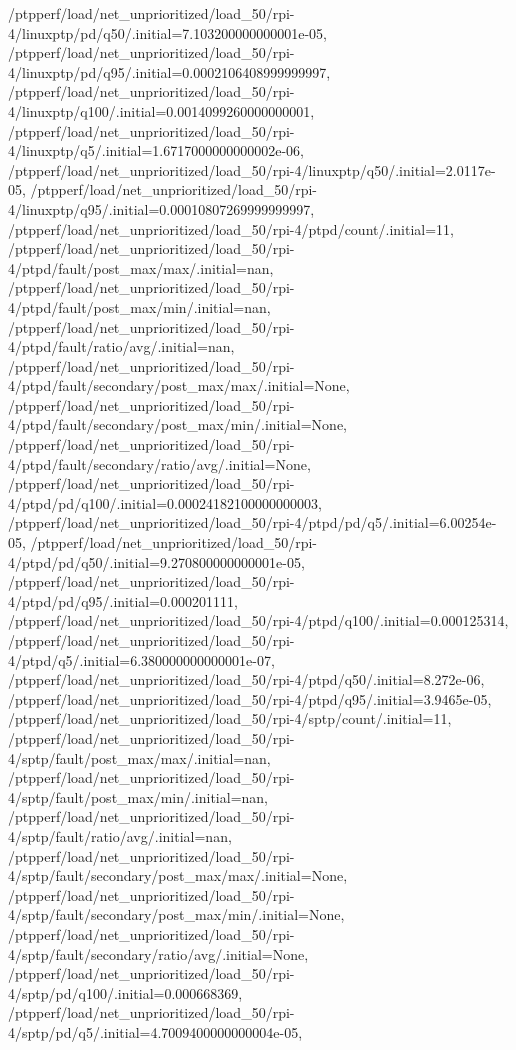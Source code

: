 {    /ptpperf/load/net_unprioritized/load_50/rpi-4/linuxptp/pd/q50/.initial=7.103200000000001e-05,
    /ptpperf/load/net_unprioritized/load_50/rpi-4/linuxptp/pd/q95/.initial=0.0002106408999999997,
    /ptpperf/load/net_unprioritized/load_50/rpi-4/linuxptp/q100/.initial=0.0014099260000000001,
    /ptpperf/load/net_unprioritized/load_50/rpi-4/linuxptp/q5/.initial=1.6717000000000002e-06,
    /ptpperf/load/net_unprioritized/load_50/rpi-4/linuxptp/q50/.initial=2.0117e-05,
    /ptpperf/load/net_unprioritized/load_50/rpi-4/linuxptp/q95/.initial=0.00010807269999999997,
    /ptpperf/load/net_unprioritized/load_50/rpi-4/ptpd/count/.initial=11,
    /ptpperf/load/net_unprioritized/load_50/rpi-4/ptpd/fault/post_max/max/.initial=nan,
    /ptpperf/load/net_unprioritized/load_50/rpi-4/ptpd/fault/post_max/min/.initial=nan,
    /ptpperf/load/net_unprioritized/load_50/rpi-4/ptpd/fault/ratio/avg/.initial=nan,
    /ptpperf/load/net_unprioritized/load_50/rpi-4/ptpd/fault/secondary/post_max/max/.initial=None,
    /ptpperf/load/net_unprioritized/load_50/rpi-4/ptpd/fault/secondary/post_max/min/.initial=None,
    /ptpperf/load/net_unprioritized/load_50/rpi-4/ptpd/fault/secondary/ratio/avg/.initial=None,
    /ptpperf/load/net_unprioritized/load_50/rpi-4/ptpd/pd/q100/.initial=0.00024182100000000003,
    /ptpperf/load/net_unprioritized/load_50/rpi-4/ptpd/pd/q5/.initial=6.00254e-05,
    /ptpperf/load/net_unprioritized/load_50/rpi-4/ptpd/pd/q50/.initial=9.270800000000001e-05,
    /ptpperf/load/net_unprioritized/load_50/rpi-4/ptpd/pd/q95/.initial=0.000201111,
    /ptpperf/load/net_unprioritized/load_50/rpi-4/ptpd/q100/.initial=0.000125314,
    /ptpperf/load/net_unprioritized/load_50/rpi-4/ptpd/q5/.initial=6.380000000000001e-07,
    /ptpperf/load/net_unprioritized/load_50/rpi-4/ptpd/q50/.initial=8.272e-06,
    /ptpperf/load/net_unprioritized/load_50/rpi-4/ptpd/q95/.initial=3.9465e-05,
    /ptpperf/load/net_unprioritized/load_50/rpi-4/sptp/count/.initial=11,
    /ptpperf/load/net_unprioritized/load_50/rpi-4/sptp/fault/post_max/max/.initial=nan,
    /ptpperf/load/net_unprioritized/load_50/rpi-4/sptp/fault/post_max/min/.initial=nan,
    /ptpperf/load/net_unprioritized/load_50/rpi-4/sptp/fault/ratio/avg/.initial=nan,
    /ptpperf/load/net_unprioritized/load_50/rpi-4/sptp/fault/secondary/post_max/max/.initial=None,
    /ptpperf/load/net_unprioritized/load_50/rpi-4/sptp/fault/secondary/post_max/min/.initial=None,
    /ptpperf/load/net_unprioritized/load_50/rpi-4/sptp/fault/secondary/ratio/avg/.initial=None,
    /ptpperf/load/net_unprioritized/load_50/rpi-4/sptp/pd/q100/.initial=0.000668369,
    /ptpperf/load/net_unprioritized/load_50/rpi-4/sptp/pd/q5/.initial=4.7009400000000004e-05,
}
